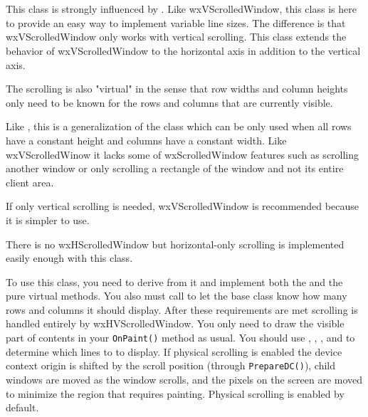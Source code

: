 
\section{}\label{wxhvscrolledwindow}

This class is strongly influenced by 
. 
Like wxVScrolledWindow, this class is here to provide an easy way to implement
variable line sizes.  The difference is that wxVScrolledWindow only works with
vertical scrolling.  This class extends the behavior of wxVScrolledWindow to
the horizontal axis in addition to the vertical axis.

The scrolling is also "virtual" in the sense that row widths and column heights
only need to be known for the rows and columns that are currently visible.

Like , this is a generalization
of the  class which can be only
used when all rows have a constant height and columns have a constant width. 
Like wxVScrolledWinow it lacks some of wxScrolledWindow features such as
scrolling another window or only scrolling a rectangle of the window and not
its entire client area.

If only vertical scrolling is needed, wxVScrolledWindow is recommended
because it is simpler to use.
   
There is no wxHScrolledWindow but horizontal-only scrolling is implemented
easily enough with this class.

To use this class, you need to derive from it and implement both the 
 and the 
 pure virtual
methods. You also must call 
 to let the
base class know how many rows and columns it should display. After these
requirements are met scrolling is handled entirely by wxHVScrolledWindow. You
only need to draw the visible part of contents in your {\tt OnPaint()} method
as usual. You should use 
, 
, 
, and 
 to
determine which lines to to display. If physical scrolling is enabled the
device context origin is shifted by the scroll position (through
{\tt PrepareDC()}), child windows are moved as the window scrolls, and the
pixels on the screen are moved to minimize the region that requires painting.
Physical scrolling is enabled by default.

